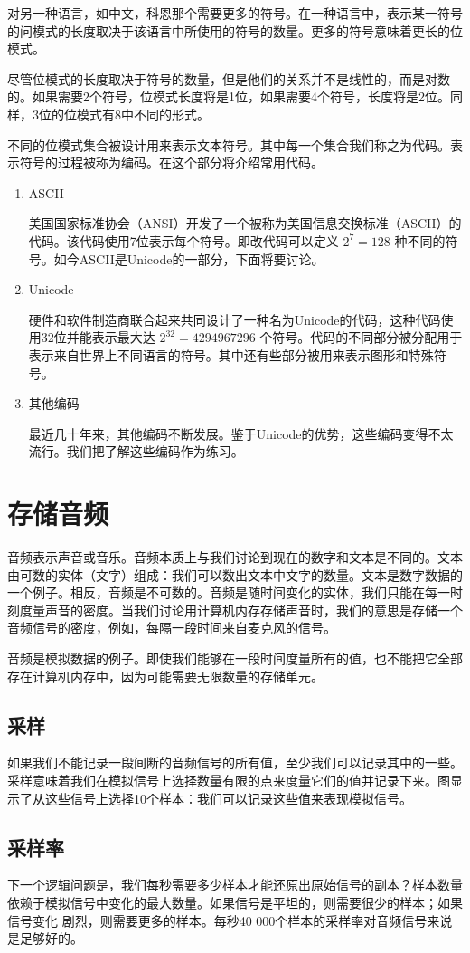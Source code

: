 对另一种语言，如中文，科恩那个需要更多的符号。在一种语言中，表示某一符号的问模式的长度取决于该语言中所使用的符号的数量。更多的符号意味着更长的位模式。

尽管位模式的长度取决于符号的数量，但是他们的关系并不是线性的，而是对数的。如果需要2个符号，位模式长度将是1位，如果需要4个符号，长度将是2位。同样，3位的位模式有8中不同的形式。

不同的位模式集合被设计用来表示文本符号。其中每一个集合我们称之为代码。表示符号的过程被称为编码。在这个部分将介绍常用代码。

\begin{enumerate}
	\item ASCII

	美国国家标准协会（ANSI）开发了一个被称为美国信息交换标准（ASCII）的代码。该代码使用7位表示每个符号。即改代码可以定义
	$2^7=128$
	种不同的符号。如今ASCII是Unicode的一部分，下面将要讨论。
	\item Unicode

	硬件和软件制造商联合起来共同设计了一种名为Unicode的代码，这种代码使用32位并能表示最大达
	$2^32=4 294 967 296$
	个符号。代码的不同部分被分配用于表示来自世界上不同语言的符号。其中还有些部分被用来表示图形和特殊符号。
	\item 其他编码

	最近几十年来，其他编码不断发展。鉴于Unicode的优势，这些编码变得不太流行。我们把了解这些编码作为练习。
\end{enumerate}
\section{存储音频}
音频表示声音或音乐。音频本质上与我们讨论到现在的数字和文本是不同的。文本由可数的实体（文字）组成：我们可以数出文本中文字的数量。文本是数字数据的一个例子。相反，音频是不可数的。音频是随时间变化的实体，我们只能在每一时刻度量声音的密度。当我们讨论用计算机内存存储声音时，我们的意思是存储一个音频信号的密度，例如，每隔一段时间来自麦克风的信号。

音频是模拟数据的例子。即使我们能够在一段时间度量所有的值，也不能把它全部存在计算机内存中，因为可能需要无限数量的存储单元。

\subsection{采样}
如果我们不能记录一段间断的音频信号的所有值，至少我们可以记录其中的一些。采样意味着我们在模拟信号上选择数量有限的点来度量它们的值并记录下来。图显示了从这些信号上选择10个样本：我们可以记录这些值来表现模拟信号。
\subsection{采样率}
下一个逻辑问题是，我们每秒需要多少样本才能还原出原始信号的副本？样本数量依赖于模拟信号中变化的最大数量。如果信号是平坦的，则需要很少的样本；如果信号变化 剧烈，则需要更多的样本。每秒40 000个样本的采样率对音频信号来说是足够好的。
